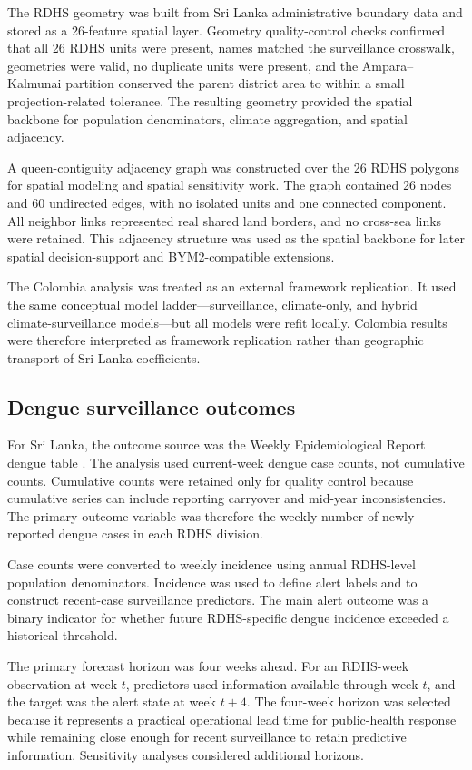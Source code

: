 \documentclass[11pt,a4paper]{article}
\begin{document}
The RDHS geometry was built from Sri Lanka administrative boundary data and stored as a 26-feature spatial layer. Geometry quality-control checks confirmed that all 26 RDHS units were present, names matched the surveillance crosswalk, geometries were valid, no duplicate units were present, and the Ampara--Kalmunai partition conserved the parent district area to within a small projection-related tolerance. The resulting geometry provided the spatial backbone for population denominators, climate aggregation, and spatial adjacency.

A queen-contiguity adjacency graph was constructed over the 26 RDHS polygons for spatial modeling and spatial sensitivity work. The graph contained 26 nodes and 60 undirected edges, with no isolated units and one connected component. All neighbor links represented real shared land borders, and no cross-sea links were retained. This adjacency structure was used as the spatial backbone for later spatial decision-support and BYM2-compatible extensions.

The Colombia analysis was treated as an external framework replication. It used the same conceptual model ladder---surveillance, climate-only, and hybrid climate-surveillance models---but all models were refit locally. Colombia results were therefore interpreted as framework replication rather than geographic transport of Sri Lanka coefficients.

\subsection{Dengue surveillance outcomes}
\label{subsec:dengue-outcomes}

For Sri Lanka, the outcome source was the Weekly Epidemiological Report dengue table
\citep{SriLankaWER}. The analysis used current-week dengue case counts, not cumulative counts. Cumulative counts were retained only for quality control because cumulative series can include reporting carryover and mid-year inconsistencies. The primary outcome variable was therefore the weekly number of newly reported dengue cases in each RDHS division.

Case counts were converted to weekly incidence using annual RDHS-level population denominators. Incidence was used to define alert labels and to construct recent-case surveillance predictors. The main alert outcome was a binary indicator for whether future RDHS-specific dengue incidence exceeded a historical threshold.

The primary forecast horizon was four weeks ahead. For an RDHS-week observation at week $t$, predictors used information available through week $t$, and the target was the alert state at week $t+4$. The four-week horizon was selected because it represents a practical operational lead time for public-health response while remaining close enough for recent surveillance to retain predictive information. Sensitivity analyses considered additional horizons.
\end{document}
